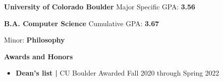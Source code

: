 \documentclass[12pt]{article}
\begin{document}
\begin{flushleft}
  \hrulefill {} \quad \hrulefill

  \vspace{1mm}

  {\textbf{University of Colorado Boulder} }\hfill { \quad Major Specific GPA: \textbf{3.56}}
  \vspace{.5mm}

  {\quad \textbf{B.A. Computer Science}} \hfill {Cumulative GPA: \textbf{3.67}}

  {\quad \hspace{3mm} Minor: \textbf{Philosophy}} 

  {\vspace{2mm}}

  {\quad \textbf{Awards and Honors}}

  {\vspace{-4.3mm}}

  \begin{itemize} \setlength\itemsep{-0.3em}
    \item {\textbf{Dean's list  | }CU Boulder} 
      \hfill Awarded Fall 2020 through Spring 2022
  \end{itemize}

\end{flushleft}



\vspace{-6mm}
\end{document}
